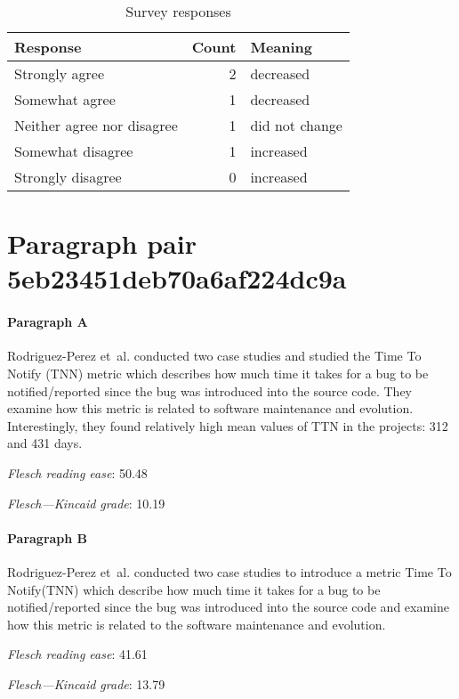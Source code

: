 \begin{table}[!h]
\centering
\begin{tabular}{lrl}
\toprule
          \textbf{Response} &  \textbf{Count} & \textbf{Meaning} \\
\midrule
             Strongly agree &               2 &        decreased \\
             Somewhat agree &               1 &        decreased \\
 Neither agree nor disagree &               1 &   did not change \\
          Somewhat disagree &               1 &        increased \\
          Strongly disagree &               0 &        increased \\
\bottomrule
\end{tabular}
\caption*{Survey responses}\end{table}


\newpage
\section{Paragraph pair 5eb23451deb70a6af224dc9a}
\paragraph{Paragraph A}
Rodriguez-Perez et al. conducted two case studies and studied the Time To Notify (TNN) metric which describes how much time it takes for a bug to be notified/reported since the bug was introduced into the source code. They examine how this metric is related to software maintenance and evolution. Interestingly, they found relatively high mean values of TTN in the projects: 312 and 431 days.\par\medskip
\emph{Flesch reading ease}: 50.48\par
\emph{Flesch---Kincaid grade}: 10.19

\paragraph{Paragraph B}
Rodriguez-Perez et al. conducted two case studies to introduce a metric Time To Notify(TNN) which describe how much time it takes for a bug to be notified/reported since the bug was introduced into the source code and examine how this metric is related to the software maintenance and evolution.\par\medskip
\emph{Flesch reading ease}: 41.61\par
\emph{Flesch---Kincaid grade}: 13.79

